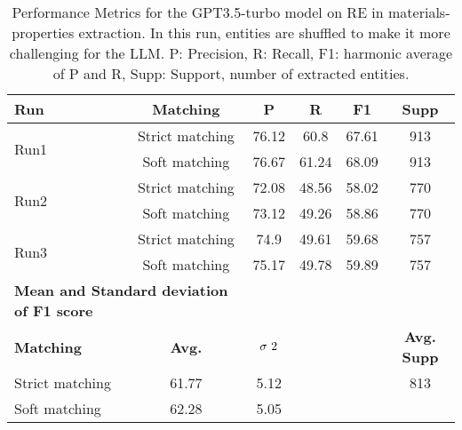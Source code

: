 \begin{table}[htbp]
    \small
    \centering
    \caption{Performance Metrics for the GPT3.5-turbo model on RE in materials-properties extraction. In this run, entities are shuffled to make it more challenging for the LLM. P: Precision, R: Recall, F1: harmonic average of P and R, Supp: Support, number of extracted entities.}
    \begin{tabular}{lccccc}
        \toprule
        \textbf{Run} & \textbf{Matching} & \textbf{P} & \textbf{R} & \textbf{F1} & \textbf{Supp} \\
        \midrule
        \multirow{2}{*}{Run1} & Strict matching & 76.12 & 60.8 & 67.61 & 913 \\
        & Soft matching & 76.67 & 61.24 & 68.09 & 913 \\
        \midrule
        \multirow{2}{*}{Run2} & Strict matching & 72.08 & 48.56 & 58.02 & 770 \\
        & Soft matching & 73.12 & 49.26 & 58.86 & 770 \\
        \midrule
        \multirow{2}{*}{Run3} & Strict matching & 74.9 & 49.61 & 59.68 & 757 \\
        & Soft matching & 75.17 & 49.78 & 59.89 & 757 \\
        \midrule
        \multicolumn{2}{l}{\textbf{Mean and Standard deviation of F1 score}} & & & & \\
        \midrule
        \textbf{Matching} & \textbf{Avg.} & $\sigma\textsuperscript{2}$ & & & \textbf{Avg. Supp}\\
        Strict matching & 61.77 & 5.12 & & & 813 \\
        Soft matching & 62.28 & 5.05 & & \\
        \bottomrule
    \end{tabular}
\end{table}


